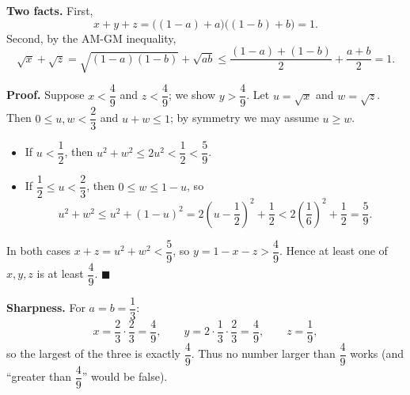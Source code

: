\textbf{Two facts.} First,
\[x+y+z=\bigl((1-a)+a\bigr)\bigl((1-b)+b\bigr)=1.\]
Second, by the AM-GM inequality,
\[\sqrt x+\sqrt z=\sqrt{(1-a)(1-b)}+\sqrt{ab}\le\dfrac{(1-a)+(1-b)}{2}+\dfrac{a+b}{2}=1.\]

\textbf{Proof.} Suppose $x<\dfrac49$ and $z<\dfrac49$; we show $y>\dfrac49$. Let $u=\sqrt x$ and $w=\sqrt z$. Then $0\le u,w<\dfrac23$ and $u+w\le1$; by symmetry we may assume $u\ge w$.
\begin{itemize}
\item If $u<\dfrac12$, then $u^2+w^2\le2u^2<\dfrac12<\dfrac59$.
\item If $\dfrac12\le u<\dfrac23$, then $0\le w\le1-u$, so
\[u^2+w^2\le u^2+(1-u)^2=2\left(u-\dfrac12\right)^2+\dfrac12<2\left(\dfrac16\right)^2+\dfrac12=\dfrac59.\]
\end{itemize}
In both cases $x+z=u^2+w^2<\dfrac59$, so $y=1-x-z>\dfrac49$. Hence at least one of $x,y,z$ is at least $\dfrac49$. $\blacksquare$

\textbf{Sharpness.} For $a=b=\dfrac13$:
\[x=\dfrac23\cdot\dfrac23=\dfrac49,\qquad y=2\cdot\dfrac13\cdot\dfrac23=\dfrac49,\qquad z=\dfrac19,\]
so the largest of the three is exactly $\dfrac49$. Thus no number larger than $\dfrac49$ works (and ``greater than $\dfrac49$'' would be false).

